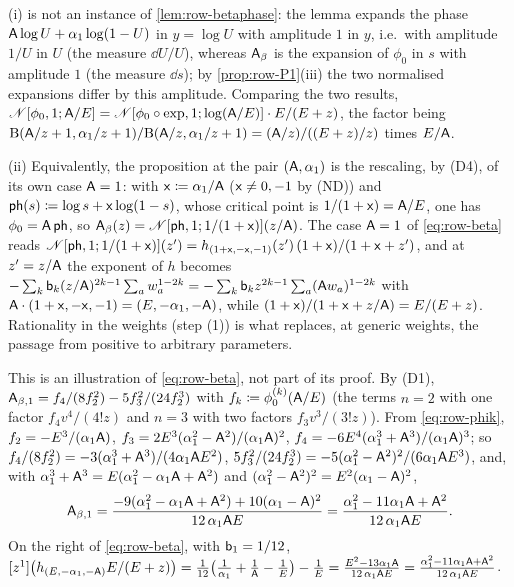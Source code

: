 \begin{rmk}
\label{rmk:row-betaroutes}
(i)  is not an instance of \cref{lem:row-betaphase}: the lemma expands the phase $\mathsf{A}\log U+\alpha_1\log(1-U)$ in $y=\log U$ with amplitude $1$ in $y$, i.e.\ with amplitude $1/U$ in $U$ (the measure $\dd U/U$), whereas $\mathsf{A}_{\beta}$ is the expansion of $\phi_0$ in $s$ with amplitude $1$ (the measure $\dd s$); by \cref{prop:row-P1}(iii) the two normalised expansions differ by this amplitude. Comparing the two results, $\mathscr{N}[\phi_0,1;\mathsf{A}/E]=\mathscr{N}[\phi_0\circ\exp,1;\log(\mathsf{A}/E)]\cdot E/(E+z)$, the factor being $\mathrm{B}(\mathsf{A}/z+1,\alpha_1/z+1)/\mathrm{B}(\mathsf{A}/z,\alpha_1/z+1)=(\mathsf{A}/z)/((E+z)/z)$ times $E/\mathsf{A}$. 

(ii) Equivalently, the proposition at the pair $(\mathsf{A},\alpha_1)$ is the rescaling, by (D4), of its own case $\mathsf{A}=1$: with $\mathsf{x}\coloneqq\alpha_1/\mathsf{A}$ ($\mathsf{x}\neq0,-1$ by (ND)) and $\mathsf{ph}(s)\coloneqq\log s+\mathsf{x}\log(1-s)$, whose critical point is $1/(1+\mathsf{x})=\mathsf{A}/E$, one has $\phi_0=\mathsf{A}\,\mathsf{ph}$, so $\mathsf{A}_{\beta}(z)=\mathscr{N}[\mathsf{ph},1;1/(1+\mathsf{x})](z/\mathsf{A})$. The case $\mathsf{A}=1$ of \eqref{eq:row-beta} reads $\mathscr{N}[\mathsf{ph},1;1/(1+\mathsf{x})](z')=h_{(1+\mathsf{x},-\mathsf{x},-1)}(z')\,(1+\mathsf{x})/(1+\mathsf{x}+z')$, and at $z'=z/\mathsf{A}$ the exponent of $h$ becomes $-\sum_k\mathsf{b}_k(z/\mathsf{A})^{2k-1}\sum_aw_a^{1-2k}=-\sum_k\mathsf{b}_kz^{2k-1}\sum_a(\mathsf{A} w_a)^{1-2k}$ with $\mathsf{A}\cdot(1+\mathsf{x},-\mathsf{x},-1)=(E,-\alpha_1,-\mathsf{A})$, while $(1+\mathsf{x})/(1+\mathsf{x}+z/\mathsf{A})=E/(E+z)$. Rationality in the weights (step (1)) is what replaces, at generic weights, the passage from positive to arbitrary parameters.
\end{rmk}

\begin{example}
\label{ex:row-beta1}
This is an illustration of \eqref{eq:row-beta}, not part of its proof. By (D1), $\mathsf{A}_{\beta,1}=f_4/(8f_2^2)-5f_3^2/(24f_2^3)$ with $f_k\coloneqq\phi_0^{(k)}(\mathsf{A}/E)$ (the terms $n=2$ with one factor $f_4v^4/(4!z)$ and $n=3$ with two factors $f_3v^3/(3!z)$). From \eqref{eq:row-phik}, $f_2=-E^3/(\alpha_1\mathsf{A})$, $f_3=2E^3(\alpha_1^2-\mathsf{A}^2)/(\alpha_1\mathsf{A})^2$, $f_4=-6E^4(\alpha_1^3+\mathsf{A}^3)/(\alpha_1\mathsf{A})^3$; so $f_4/(8f_2^2)=-3(\alpha_1^3+\mathsf{A}^3)/(4\alpha_1\mathsf{A} E^2)$, $5f_3^2/(24f_2^3)=-5(\alpha_1^2-\mathsf{A}^2)^2/(6\alpha_1\mathsf{A} E^3)$, and, with $\alpha_1^3+\mathsf{A}^3=E(\alpha_1^2-\alpha_1\mathsf{A}+\mathsf{A}^2)$ and $(\alpha_1^2-\mathsf{A}^2)^2=E^2(\alpha_1-\mathsf{A})^2$,
\[
\mathsf{A}_{\beta,1}=\frac{-9(\alpha_1^2-\alpha_1\mathsf{A}+\mathsf{A}^2)+10(\alpha_1-\mathsf{A})^2}{12\,\alpha_1\mathsf{A} E}=\frac{\alpha_1^2-11\alpha_1\mathsf{A}+\mathsf{A}^2}{12\,\alpha_1\mathsf{A} E}.
\]
On the right of \eqref{eq:row-beta}, with $\mathsf{b}_1=1/12$, $[z^1]\big(h_{(E,-\alpha_1,-\mathsf{A})}E/(E+z)\big)=\frac1{12}\big(\frac1{\alpha_1}+\frac1{\mathsf{A}}-\frac1E\big)-\frac1E=\frac{E^2-13\alpha_1\mathsf{A}}{12\,\alpha_1\mathsf{A} E}=\frac{\alpha_1^2-11\alpha_1\mathsf{A}+\mathsf{A}^2}{12\,\alpha_1\mathsf{A} E}$.
\end{example}

